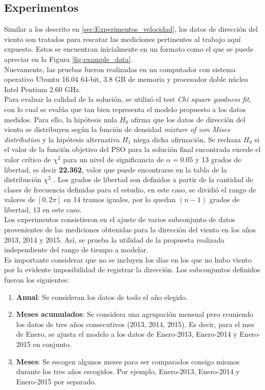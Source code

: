 \subsection{Experimentos}
Similar a los descrito en \ref{sec:Experimentos_velocidad}, los datos de dirección del viento son tratados para rescatar las mediciones pertinentes al trabajo aquí expuesto. Estos se encuentran inicialmente en un formato como el que se puede apreciar en la Figura \ref{fig:example_data}.\\
Nuevamente, las pruebas fueron realizadas en un computador con sistema operativo Ubuntu 16.04 64-bit, 3.8 GB de memoria y procesador doble núcleo Intel Pentium 2.60 GHz.\\
Para evaluar la calidad de la solución, se utilizó el test \emph{Chi square goodness fit}\cite{goodFitTest}, con lo cual se evalúa que tan bien representa el modelo propuesto a los datos medidos. Para ello, la hipótesis nula $H_0$ afirma que los datos de dirección del viento se distribuyen según la función de densidad \emph{mixture of von Mises distribution} y la hipótesis alternativa $H_1$ niega dicha afirmación. Se rechaza $H_0$ si el valor de la función objetivo del PSO para la solución final encontrada excede el valor crítico de $\chi^2$ para un nivel de significancia de $\alpha = 0.05$ y 13 grados de libertad, es decir \textbf{22.362}, valor que puede encontrarse en la tabla de la distribución $\chi^2$ \cite{chiSquareTable}. Los grados de libertad son definidos a partir de la cantidad de clases de frecuencia definidas para el estudio, en este caso, se dividió el rango de valores de $[0, 2\pi]$ en 14 tramos iguales, por lo quedan $(n-1)$ grados de libertad, 13 en este caso.\\
Los experimentos consistieron en el ajuste de varios subconjunto de datos provenientes de las mediciones obtenidas para la dirección del viento en los años 2013, 2014 y 2015. Así, se prueba la utilidad de la propuesta realizada independiente del rango de tiempo a modelar.\\
Es importante considerar que no se incluyen los días en los que no hubo viento por la evidente imposibilidad de registrar la dirección.
Los subconjuntos definidos fueron los siguientes:
\begin{enumerate}
    \item \textbf{Anual}: Se consideran los datos de todo el año elegido.
    \item \textbf{Meses acumulados}: Se considera una agrupación mensual pero reuniendo los datos de tres años consecutivos (2013, 2014, 2015). Es decir, para el mes de Enero, se ajusta el modelo a los datos de Enero-2013, Enero-2014 y Enero-2015 en conjunto.
    \item \textbf{Meses}: Se escogen algunos meses para ser comparados consigo mismos durante los tres años escogidos. Por ejemplo, Enero-2013, Enero-2014 y Enero-2015 por separado.       
\end{enumerate}

